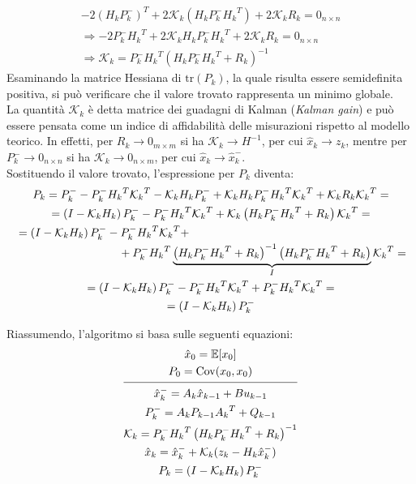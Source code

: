 \documentclass[12pt,a4paper,openright,twoside]{book}
\begin{document}
\begin{gather*}
-2(H_kP_k^-)^T+2\mathcal{K}_k\left(H_kP_k^-{H_k}^T\right)+2\mathcal{K}_kR_k=0_{n\times n} \\
\Rightarrow-2P_k^-{H_k}^T+2\mathcal{K}_kH_kP_k^-{H_k}^T+2\mathcal{K}_kR_k=0_{n\times n} \\
\Rightarrow\mathcal{K}_k=P_k^-{H_k}^T\left(H_kP_k^-{H_k}^T+R_k\right)^{-1}
\end{gather*}
Esaminando la matrice Hessiana di $\mathrm{tr}(P_k)$, la quale risulta essere semidefinita positiva, si può verificare che il valore trovato rappresenta un minimo globale. \\
La quantità $\mathcal{K}_k$ è detta matrice dei guadagni di Kalman (\textit{Kalman gain}) e può essere pensata come un indice di affidabilità delle misurazioni rispetto al modello teorico. In effetti, per $R_k\to 0_{m\times m}$ si ha $\mathcal{K}_k\to H^{-1}$, per cui $\hat{x}_k\to z_k$, mentre per $P_k^-\to 0_{n\times n}$ si ha $\mathcal{K}_k\to 0_{n\times m}$, per cui $\hat{x}_k\to \hat{x}_k^-$. \\

Sostituendo il valore trovato, l'espressione per $P_k$ diventa:
\begin{gather*}
P_k=P_k^--P_k^-{H_k}^T{\mathcal{K}_k}^T-\mathcal{K}_kH_kP_k^-+\mathcal{K}_kH_kP_k^-{H_k}^T{\mathcal{K}_k}^T+\mathcal{K}_kR_k{\mathcal{K}_k}^T= \\
=\left(I-\mathcal{K}_kH_k\right)P_k^--P_k^-{H_k}^T{\mathcal{K}_k}^T+\mathcal{K}_k\left(H_kP_k^-{H_k}^T+R_k\right){\mathcal{K}_k}^T= \\
\begin{multlined}[\textwidth]
=\left(I-\mathcal{K}_kH_k\right)P_k^--P_k^-{H_k}^T{\mathcal{K}_k}^T+ \\
+P_k^-{H_k}^T\underbrace{\left(H_kP_k^-{H_k}^T+R_k\right)^{-1}\left(H_kP_k^-{H_k}^T+R_k\right)}_{I}{\mathcal{K}_k}^T=
\end{multlined} \\
=\left(I-\mathcal{K}_kH_k\right)P_k^--P_k^-{H_k}^T{\mathcal{K}_k}^T+P_k^-{H_k}^T{\mathcal{K}_k}^T= \\
=\left(I-\mathcal{K}_kH_k\right)P_k^-
\end{gather*}

Riassumendo, l'algoritmo si basa sulle seguenti equazioni:
\begin{gather*}
\hat{x}_0=\mathbb{E}[x_0] \\
P_0=\mathrm{Cov}(x_0,x_0) \\[0.2\baselineskip]
\hline \\[-0.8\baselineskip]
\hat{x}_k^-=A_k\hat{x}_{k-1}+Bu_{k-1} \\
P_k^-=A_kP_{k-1}{A_k}^T+Q_{k-1} \\
\mathcal{K}_k=P_k^-{H_k}^T\left(H_kP_k^-{H_k}^T+R_k\right)^{-1} \\
\hat{x}_k=\hat{x}_k^-+\mathcal{K}_k(z_k-H_k\hat{x}_k^-) \\
P_k=\left(I-\mathcal{K}_kH_k\right)P_k^-
\end{gather*}
\end{document}
